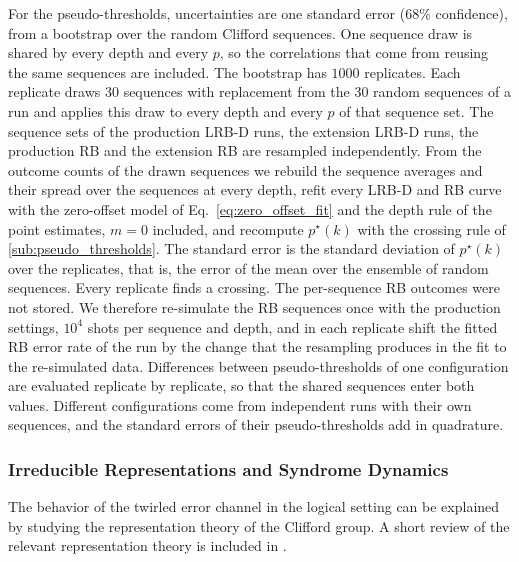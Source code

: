 For the pseudo-thresholds, uncertainties are one standard error (68\% confidence), from a bootstrap over the random Clifford sequences. One sequence draw is shared by every depth and every $p$, so the correlations that come from reusing the same sequences are included. The bootstrap has $1000$ replicates. Each replicate draws 30 sequences with replacement from the 30 random sequences of a run and applies this draw to every depth and every $p$ of that sequence set. The sequence sets of the production LRB-D runs, the extension LRB-D runs, the production RB and the extension RB are resampled independently. From the outcome counts of the drawn sequences we rebuild the sequence averages and their spread over the sequences at every depth, refit every LRB-D and RB curve with the zero-offset model of Eq.~\eqref{eq:zero_offset_fit} and the depth rule of the point estimates, $m = 0$ included, and recompute $p^\star(k)$ with the crossing rule of \autoref{sub:pseudo_thresholds}. The standard error is the standard deviation of $p^\star(k)$ over the replicates, that is, the error of the mean over the ensemble of random sequences. Every replicate finds a crossing. The per-sequence RB outcomes were not stored. We therefore re-simulate the RB sequences once with the production settings, $10^4$ shots per sequence and depth, and in each replicate shift the fitted RB error rate of the run by the change that the resampling produces in the fit to the re-simulated data. Differences between pseudo-thresholds of one configuration are evaluated replicate by replicate, so that the shared sequences enter both values. Different configurations come from independent runs with their own sequences, and the standard errors of their pseudo-thresholds add in quadrature.

\subsubsection{Irreducible Representations and Syndrome Dynamics}
\label{sub:irreps}

The behavior of the twirled error channel in the logical setting can be explained by studying the representation theory of the Clifford group.
A short review of the relevant representation theory is included in .

